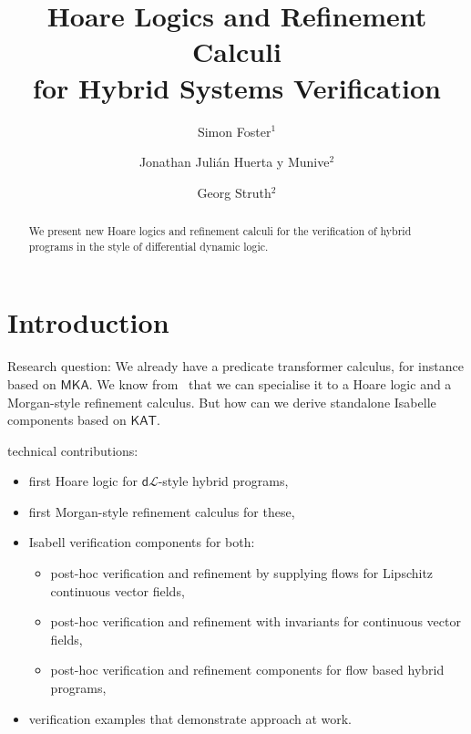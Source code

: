 \documentclass[envcountsames]{llncs}
\newcommand{\MKA}{\mathsf{MKA}}
\newcommand{\KAT}{\mathsf{KAT}}
\newcommand{\dL}{\mathsf{d}\mathcal{L}}
\begin{document}
\title{Hoare Logics and Refinement Calculi\\ for Hybrid Systems Verification} 

\author{Simon Foster$^1$ \and Jonathan Juli\'an Huerta y Munive$^2$ \and Georg Struth$^2$} 


\maketitle

\begin{abstract} 
  We present new Hoare logics and refinement calculi for the
  verification of hybrid programs in the style of differential dynamic
  logic.
\end{abstract}




\section{Introduction}\label{sec:introduction}

Research question: We already have a predicate transformer calculus,
for instance based on $\MKA$. We know from~\cite{GomesS16} that we can
specialise it to a Hoare logic and a Morgan-style refinement
calculus. But how can we derive standalone Isabelle components based
on $\KAT$. 

technical contributions:
\begin{itemize}
\item first Hoare logic for $\dL$-style hybrid programs,
\item first Morgan-style refinement calculus for these,
\item Isabell verification components for both:
  \begin{itemize}
  \item post-hoc verification and refinement by supplying flows for
    Lipschitz continuous vector fields,
\item post-hoc verification and refinement with invariants for continuous vector
  fields,
\item post-hoc verification and refinement components for flow based
  hybrid programs,
  \end{itemize}
\item verification examples that demonstrate approach at work.
\end{itemize}
\end{document}

